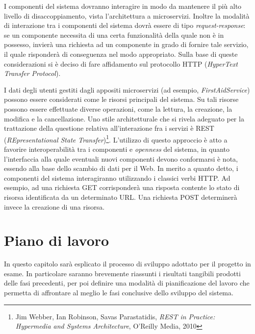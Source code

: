 \documentclass[a4paper,12pt]{report}
\begin{document}
I componenti del sistema dovranno interagire in modo da mantenere il più alto livello di disaccoppiamento, vista l'architettura a microservizi. Inoltre la modalità di interazione tra i componenti del sistema dovrà essere di tipo \emph{request-response}: se un componente necessita di una certa funzionalità della quale non è in possesso, invierà una richiesta ad un componente in grado di fornire tale servizio, il quale risponderà di conseguenza nel modo appropriato. Sulla base di queste considerazioni si è deciso di fare affidamento sul protocollo HTTP (\emph{HyperText Transfer Protocol}).

I dati degli utenti gestiti dagli appositi microservizi (ad esempio, \emph{FirstAidService}) possono essere considerati come le risorsi principali del sistema. Su tali risorse possono essere effettuate diverse operazioni, come la lettura, la creazione, la modifica e la cancellazione. Uno stile architetturale che si rivela adeguato per la trattazione della questione relativa all'interazione fra i servizi è REST (\emph{REpresentational State Transfer})\footnote{Jim Webber, Ian Robinson, Savas Parastatidis, {\em REST in Practice: Hypermedia and Systems Architecture}, O'Reilly Media, 2010}. L'utilizzo di questo approccio è atto a favorire interoperabilità tra i componenti e \emph{openness} del sistema, in quanto l'interfaccia alla quale eventuali nuovi componenti devono conformarsi è nota, essendo alla base dello scambio di dati per il Web.
In merito a quanto detto, i componenti del sistema interagiranno utilizzando i classici verbi HTTP. Ad esempio, ad una richiesta GET corrisponderà una risposta contente lo stato di risorsa identificata da un determinato URL. Una richiesta POST determinerà invece la creazione di una risorsa.


\chapter{Piano di lavoro}
In questo capitolo sarà esplicato il processo di sviluppo adottato per il progetto in esame. In particolare saranno brevemente riassunti i risultati tangibili prodotti delle fasi precedenti, per poi definire una modalità di pianificazione del lavoro che permetta di affrontare al meglio le fasi conclusive dello sviluppo del sistema.
\end{document}
